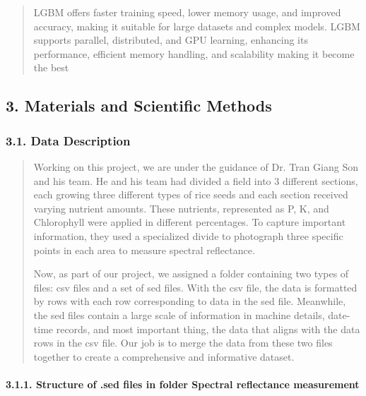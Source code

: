 \documentclass[
]{article}
\begin{document}
\begin{quote}
LGBM offers faster training speed, lower memory usage, and improved
accuracy, making it suitable for large datasets and complex models. LGBM
supports parallel, distributed, and GPU learning, enhancing its
performance, efficient memory handling, and scalability making it become
the best
\end{quote}

\hypertarget{materials-and-scientific-methods}{%
\subsection{\texorpdfstring{\textbf{3. Materials and Scientific
Methods}}{3. Materials and Scientific Methods}}\label{materials-and-scientific-methods}}

\hypertarget{data-description}{%
\subsubsection{\texorpdfstring{\textbf{3.1. Data
Description}}{3.1. Data Description}}\label{data-description}}

\begin{quote}
Working on this project, we are under the guidance of Dr. Tran Giang Son
and his team. He and his team had divided a field into 3 different
sections, each growing three different types of rice seeds and each
section received varying nutrient amounts. These nutrients, represented
as P, K, and Chlorophyll were applied in different percentages. To
capture important information, they used a specialized divide to
photograph three specific points in each area to measure spectral
reflectance.

Now, as part of our project, we assigned a folder containing two types
of files: csv files and a set of sed files. With the csv file, the data
is formatted by rows with each row corresponding to data in the sed
file. Meanwhile, the sed files contain a large scale of information in
machine details, date-time records, and most important thing, the data
that aligns with the data rows in the csv file. Our job is to merge the
data from these two files together to create a comprehensive and
informative dataset.
\end{quote}

\hypertarget{structure-of-.sed-files-in-folder-spectral-reflectance-measurement}{%
\paragraph{\texorpdfstring{\textbf{3.1.1. Structure of .sed files in
folder Spectral reflectance
measurement}}{3.1.1. Structure of .sed files in folder Spectral reflectance measurement}}\label{structure-of-.sed-files-in-folder-spectral-reflectance-measurement}}
\end{document}
